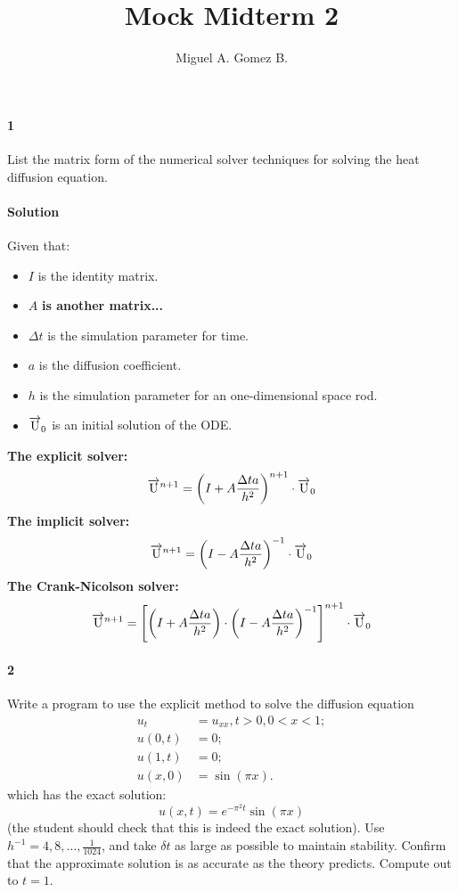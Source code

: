\documentclass{article}
\title{Mock Midterm	2}
\author{Miguel A. Gomez B.}
\begin{document}
	\maketitle
	
\paragraph{1} List the matrix form of the numerical solver techniques for solving the heat diffusion equation.
\paragraph{Solution}
Given that:
\begin{itemize}
	\item $I$ is the identity matrix.
	\item $A$ \textbf{is another matrix...}
	\item $\Delta t$ is the simulation parameter for time.
	\item $a$ is the diffusion coefficient.
	\item $h$ is the simulation parameter for an one-dimensional space rod.
	\item $\overrightarrow{\rm U}_0$ is an initial solution of the ODE.
\end{itemize}
\textbf{The explicit solver:}
$$ \overrightarrow{\rm U}^{n+1} = \left(I + A\frac{\Delta t a}{h^2}\right)^{n+1} \cdot \overrightarrow{\rm U}_0$$
\textbf{The implicit solver:}
$$\overrightarrow{\rm U}^{n+1} = \left(I - A\frac{\Delta t a}{h^2}\right)^{-1} \cdot \overrightarrow{\rm U}_{0}$$
\textbf{The Crank-Nicolson solver:}
$$\overrightarrow{\rm U}^{n+1} = \left[\left(I + A\frac{\Delta t a}{h^2}\right) \cdot \left(I - A \frac{\Delta t a}{h^2}\right)^{-1} \right]^{n+1} \cdot \overrightarrow{\rm U}_{0}$$
\paragraph{2} Write a program to use the explicit method to solve the diffusion equation
\begin{align*}
	u_t &= u_{xx}, t > 0, 0 < x < 1;\\
	u(0, t) &= 0; \\
	u(1, t) &= 0; \\
	u(x, 0) &= \sin{(\pi x)}.
\end{align*}
which has the exact solution:
$$u(x, t) = e^{-\pi^2 t} \sin{(\pi x)}$$
(the student should check that this is indeed the exact solution). Use $h^{-1} = 4, 8, \dots, \frac{1}{1024}$, and take $\delta t$ as large as possible to maintain stability. Confirm that the approximate solution is as accurate as the theory predicts. Compute out to $t = 1$.
\end{document}
